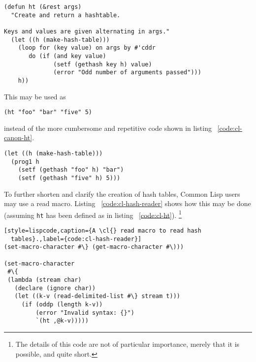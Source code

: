 \documentclass[a4paper,10pt,twoside]{report}
\newcommand{\cl}{Common Lisp}
\newcommand{\fun}[1]{\texttt{#1}}
\begin{document}
\begin{lstlisting}[style=lispcode,caption={Creating a hash
  table.},label={code:cl-ht}]
(defun ht (&rest args)
  "Create and return a hashtable.

Keys and values are given alternating in args."
  (let ((h (make-hash-table)))
    (loop for (key value) on args by #'cddr
       do (if (and key value)
              (setf (gethash key h) value)
              (error "Odd number of arguments passed")))
    h))
\end{lstlisting}
This may be used as


\begin{lstlisting}[style=lispinline]
(ht "foo" "bar" "five" 5)
\end{lstlisting}


instead of the more cumbersome and repetitive code shown in listing
~\ref{code:cl-canon-ht}.


\begin{lstlisting}[style=lispcode,caption={Canonical way to create a hash
  table.},label={code:cl-canon-ht}]
(let ((h (make-hash-table)))
  (prog1 h
    (setf (gethash "foo" h) "bar")
    (setf (gethash "five" h) 5)))
\end{lstlisting}

To further shorten and clarify the creation of hash tables, \cl{} users may use
a read macro. Listing ~\ref{code:cl-hash-reader} shows how this may be done
(assuming \fun{ht} has been defined as in listing ~\ref{code:cl-ht}).
\footnote{The details of this code are not of particular importance, merely that
  it is possible, and quite short.}

\begin{lstlisting}[style=lispcode,caption={A \cl{} read macro to read hash
  tables}.,label={code:cl-hash-reader}]
(set-macro-character #\} (get-macro-character #\)))

(set-macro-character
 #\{
 (lambda (stream char)
   (declare (ignore char))
   (let ((k-v (read-delimited-list #\} stream t)))
     (if (oddp (length k-v))
         (error "Invalid syntax: {}")
         `(ht ,@k-v)))))
\end{lstlisting}
\end{document}
